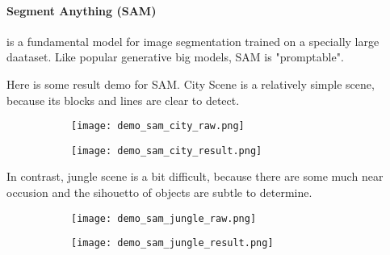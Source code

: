 \paragraph{Segment Anything (SAM)}
    is a fundamental model for image segmentation trained on a specially large daataset. 
    Like popular generative big models, SAM is "promptable".

Here is some result demo for SAM. City Scene is a relatively simple scene, because its blocks and lines 
are clear to detect.

\begin{figure}[h!]
    \caption{SAM on City scene}
    \begin{subfigure}{0.48\linewidth}
        \texttt{[image: demo\_sam\_city\_raw.png]}
    \end{subfigure}
    \begin{subfigure}{0.48\linewidth}
        \texttt{[image: demo\_sam\_city\_result.png]}
    \end{subfigure}
\end{figure}

In contrast, jungle scene is a bit difficult, because 
there are some much near occusion and the sihouetto of 
objects are subtle to determine.

\begin{figure}[h!]
    \caption{SAM on Jungle scene}
    \begin{subfigure}{0.48\linewidth}
        \texttt{[image: demo\_sam\_jungle\_raw.png]}
    \end{subfigure}
    \begin{subfigure}{0.48\linewidth}
        \texttt{[image: demo\_sam\_jungle\_result.png]}
    \end{subfigure}
\end{figure}

